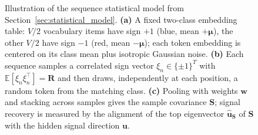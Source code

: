 \documentclass{article}
\def\vmu{{\bm{\mu}}}
\def\vc{{\bm{c}}}
\def\ve{{\bm{e}}}
\def\vu{{\bm{u}}}
\def\vw{{\bm{w}}}
\def\mR{{\bm{R}}}
\def\mS{{\bm{S}}}
\def\sR{{\mathbb{R}}}
\newcommand{\E}{\mathbb{E}}
\begin{document}
\begin{figure}[t!]
    
    \caption{Illustration of the sequence statistical model from Section~\ref{sec:statistical_model}. \textbf{(a)} A fixed two-class embedding table: $V/2$ vocabulary items have sign $+1$ (blue, mean $+\vmu$), the other $V/2$ have sign $-1$ (red, mean $-\vmu$); each token embedding is centered on its class mean plus isotropic Gaussian noise. \textbf{(b)} Each sequence samples a correlated sign vector $\xi_n\in\{\pm1\}^T$ with $\E[\xi_n\xi_n^\top]=\mR$ and then draws, independently at each position, a random token from the matching class. \textbf{(c)} Pooling with weights $\vw$ and stacking across samples gives the sample covariance $\mS$; signal recovery is measured by the alignment of the top eigenvector $\hat\vu_\mS$ of $\mS$ with the hidden signal direction $\vu$.}
    \label{fig:model}
\end{figure}
\end{document}
